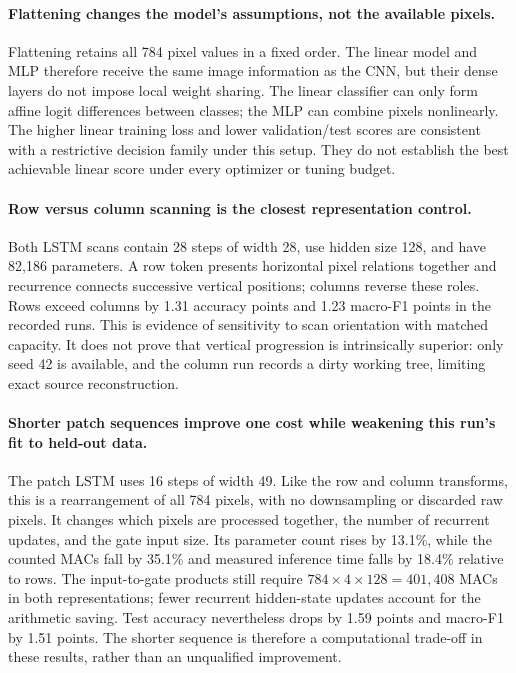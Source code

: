 \paragraph{Flattening changes the model's assumptions, not the available pixels.}
Flattening retains all 784 pixel values in a fixed order. The linear model and MLP therefore receive the same image information as the CNN, but their dense layers do not impose local weight sharing. The linear classifier can only form affine logit differences between classes; the MLP can combine pixels nonlinearly. The higher linear training loss and lower validation/test scores are consistent with a restrictive decision family under this setup. They do not establish the best achievable linear score under every optimizer or tuning budget.

\paragraph{Row versus column scanning is the closest representation control.}
Both LSTM scans contain 28 steps of width 28, use hidden size 128, and have 82,186 parameters. A row token presents horizontal pixel relations together and recurrence connects successive vertical positions; columns reverse these roles. Rows exceed columns by 1.31 accuracy points and 1.23 macro-F1 points in the recorded runs. This is evidence of sensitivity to scan orientation with matched capacity. It does not prove that vertical progression is intrinsically superior: only seed 42 is available, and the column run records a dirty working tree, limiting exact source reconstruction.

\paragraph{Shorter patch sequences improve one cost while weakening this run's fit to held-out data.}
The patch LSTM uses 16 steps of width 49. Like the row and column transforms, this is a rearrangement of all 784 pixels, with no downsampling or discarded raw pixels. It changes which pixels are processed together, the number of recurrent updates, and the gate input size. Its parameter count rises by 13.1\%, while the counted MACs fall by 35.1\% and measured inference time falls by 18.4\% relative to rows. The input-to-gate products still require $784\times4\times128=401{,}408$ MACs in both representations; fewer recurrent hidden-state updates account for the arithmetic saving. Test accuracy nevertheless drops by 1.59 points and macro-F1 by 1.51 points. The shorter sequence is therefore a computational trade-off in these results, rather than an unqualified improvement.

